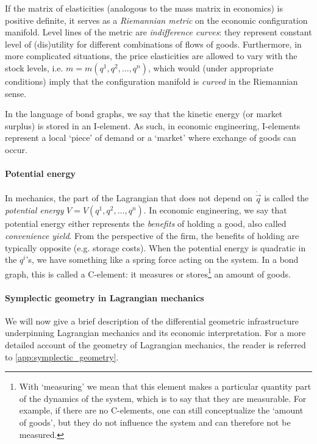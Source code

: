 If the matrix of elasticities (analogous to the mass matrix in economics) is positive definite, it serves as a \emph{Riemannian metric} on the economic configuration manifold. Level lines of the metric are \emph{indifference curves}: they represent constant level of (dis)utility for different combinations of flows of goods. Furthermore, in more complicated situations, the price elasticities are allowed to vary with the stock levels, i.e. $ m = m(q^1, q^2, \ldots, q^n)$, which would (under appropriate conditions) imply that the  configuration manifold is \emph{curved} in the Riemannian sense.

In the language of bond graphs, we say that the kinetic energy (or market surplus) is stored in an I-element. As such, in economic engineering, I-elements represent a local `piece' of demand or a `market' where exchange of goods can occur.

\paragraph{Potential energy} In mechanics, the part of the Lagrangian that does not depend on $\dot{\vec{q}}$ is called the \emph{potential energy} $V = V(q^1, q^2, \ldots, q^n)$. In economic engineering, we say that potential energy either represents the \emph{benefits} of holding a good, also called \emph{convenience yield}. From the perspective of the firm, the benefits of holding are typically opposite (e.g. storage costs). When the potential energy is quadratic in the $q^i$'s, we have something like a spring force acting on the system. In a bond graph, this is called a C-element: it measures or stores\footnote{With `measuring' we mean that this element makes a particular quantity part of the dynamics of the system, which is to say that they are measurable. For example, if there are no C-elements, one can still conceptualize the `amount of goods', but they do not influence the system and can therefore not be measured.} an amount of goods.

\paragraph{Symplectic geometry in Lagrangian mechanics} 
We will now give a brief description of the differential geometric infrastructure underpinning Lagrangian mechanics and its economic interpretation. For a more detailed account of the geometry of Lagrangian mechanics, the reader is referred to \cref{app:symplectic_geometry}. 

